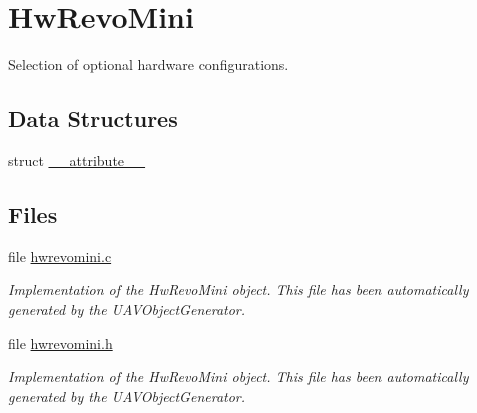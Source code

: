 \hypertarget{group___hw_revo_mini}{\section{\-Hw\-Revo\-Mini}
\label{group___hw_revo_mini}
}


\-Selection of optional hardware configurations.  


\subsection*{\-Data \-Structures}
\begin{DoxyCompactItemize}
\item 
struct \hyperlink{struct____attribute____}{\-\_\-\-\_\-attribute\-\_\-\-\_\-}
\end{DoxyCompactItemize}
\subsection*{\-Files}
\begin{DoxyCompactItemize}
\item 
file \hyperlink{hwrevomini_8c}{hwrevomini.\-c}
\begin{DoxyCompactList}\small\item\em \-Implementation of the \-Hw\-Revo\-Mini object. \-This file has been automatically generated by the \-U\-A\-V\-Object\-Generator. \end{DoxyCompactList}\item 
file \hyperlink{hwrevomini_8h}{hwrevomini.\-h}
\begin{DoxyCompactList}\small\item\em \-Implementation of the \-Hw\-Revo\-Mini object. \-This file has been automatically generated by the \-U\-A\-V\-Object\-Generator. \end{DoxyCompactList}\end{DoxyCompactItemize}
